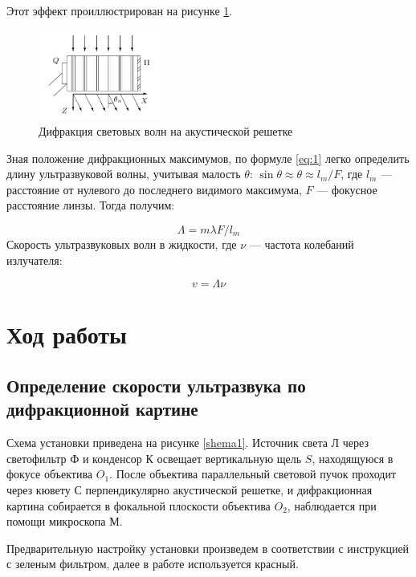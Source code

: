 \documentclass[a4paper,12pt]{article}
\begin{document}
Этот эффект проиллюстрирован на рисунке \ref{diff}.
\begin{figure}[bhtp!]
	\centering	
	\includegraphics[width=0.36\textwidth]{difraction.png}
	\caption{Дифракция световых волн на акустической решетке}
	\label{diff}
\end{figure}

Зная положение дифракционных максимумов, по формуле \eqref{eq:1} легко определить длину ультразвуковой волны, учитывая малость $ \theta $: $ \sin \theta \approx \theta \approx l_m /F  $, где $ l_m $ --- расстояние от нулевого до последнего видимого максимума, $ F $ --- фокусное расстояние линзы. Тогда получим:

\begin{equation}\label{eq:2}
\Lambda = m \lambda F/ l_m 
\end{equation}
Скорость ультразвуковых волн в жидкости, где $ \nu $ --- частота колебаний излучателя:

\begin{equation}\label{eq:3}
v = \Lambda \nu 
\end{equation}

\section*{Ход работы}

\subsection*{Определение скорости ультразвука по дифракционной картине}

Схема установки приведена на рисунке \ref{shema1}. Источник света Л через светофильтр Ф и конденсор К освещает вертикальную щель $S$, находящуюся в фокусе объектива $O_1$. После объектива параллельный световой пучок проходит через кювету С перпендикулярно акустической решетке, и дифракционная картина собирается в фокальной плоскости объектива $O_2$, наблюдается при помощи микроскопа М.
	
Предварительную настройку установки произведем в соответствии с инструкцией с зеленым фильтром, далее в работе используется красный.
	
\end{document}
